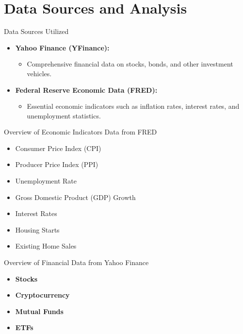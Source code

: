 \documentclass{beamer}
\begin{document}
\section{Data Sources and Analysis}
\begin{frame}{Data Sources Utilized}
    \begin{itemize}
        \item \textbf{Yahoo Finance (YFinance):}
        \begin{itemize}
            \item Comprehensive financial data on stocks, bonds, and other investment vehicles.
        \end{itemize}
        \item \textbf{Federal Reserve Economic Data (FRED):}
        \begin{itemize}
            \item Essential economic indicators such as inflation rates, interest rates, and unemployment statistics.
        \end{itemize}
    \end{itemize}
\end{frame}

\begin{frame}{Overview of Economic Indicators Data from FRED}
  \begin{itemize}
    \item Consumer Price Index (CPI) 
    \item Producer Price Index (PPI) 
    \item Unemployment Rate 
    \item Gross Domestic Product (GDP) Growth 
    \item Interest Rates 
    \item Housing Starts
    \item Existing Home Sales 
  \end{itemize}
\end{frame}


\begin{frame}{Overview of Financial Data from Yahoo Finance}
    \begin{itemize}
        \item \textbf{Stocks}
        \item \textbf{Cryptocurrency}
        \item \textbf{Mutual Funds}
        \item \textbf{ETFs}
    \end{itemize}
\end{frame}
\end{document}
